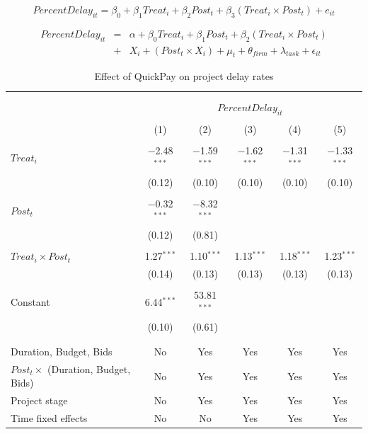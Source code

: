 \documentclass[
]{article}
\begin{document}
\[ PercentDelay_{it} = \beta_0 + \beta_1 Treat_i + \beta_2 Post_t + \beta_3 (Treat_i \times Post_t) + e_{it}\]

\[ \begin{aligned} PercentDelay_{it} &=& \alpha+\beta_0 Treat_i + \beta_1 Post_t + \beta_2 (Treat_i \times Post_t)\\
&+&  X_i + (Post_t \times X_i) + \mu_t + \theta_{firm} + \lambda_{task}+ \epsilon_{it}
\end{aligned}\]

\begin{table}[H] \centering 
  \caption{Effect of QuickPay on project delay rates} 
  \label{} 
\small 
\begin{tabular}{@{\extracolsep{-2pt}}lccccc} 
\\[-1.8ex]\hline 
\hline \\[-1.8ex] 
\\[-1.8ex] & \multicolumn{5}{c}{$PercentDelay_{it}$} \\ 
\\[-1.8ex] & (1) & (2) & (3) & (4) & (5)\\ 
\hline \\[-1.8ex] 
 $Treat_i$ & $-$2.48$^{***}$ & $-$1.59$^{***}$ & $-$1.62$^{***}$ & $-$1.31$^{***}$ & $-$1.33$^{***}$ \\ 
  & (0.12) & (0.10) & (0.10) & (0.10) & (0.10) \\ 
  & & & & & \\ 
 $Post_t$ & $-$0.32$^{***}$ & $-$8.32$^{***}$ &  &  &  \\ 
  & (0.12) & (0.81) &  &  &  \\ 
  & & & & & \\ 
 $Treat_i \times Post_t$ & 1.27$^{***}$ & 1.10$^{***}$ & 1.13$^{***}$ & 1.18$^{***}$ & 1.23$^{***}$ \\ 
  & (0.14) & (0.13) & (0.13) & (0.13) & (0.13) \\ 
  & & & & & \\ 
 Constant & 6.44$^{***}$ & 53.81$^{***}$ &  &  &  \\ 
  & (0.10) & (0.61) &  &  &  \\ 
  & & & & & \\ 
\hline \\[-1.8ex] 
Duration, Budget, Bids & No & Yes & Yes & Yes & Yes \\ 
$Post_t \times$  (Duration, Budget, Bids) & No & Yes & Yes & Yes & Yes \\ 
Project stage & No & Yes & Yes & Yes & Yes \\ 
Time fixed effects & No & No & Yes & Yes & Yes \\ 

\end{tabular}
\end{table}
\end{document}
